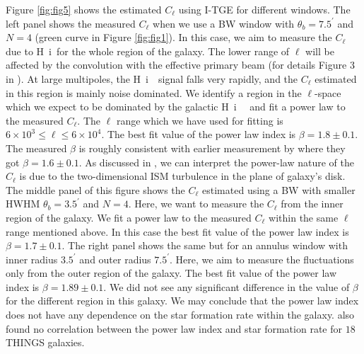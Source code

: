 \documentclass{article}
\def\HI{H~{\sc i}~}
\begin{document}
Figure \ref {fig:fig5} shows the estimated $C_{\ell}$ using I-TGE for
different windows. The left panel shows the measured $C_{\ell}$ when
we use a BW window with $\theta_b=7.5^{'}$ and $N=4$ (green curve in
Figure \ref {fig:fig1}). In this case, we aim to measure the
$C_{\ell}$ due to \HI for the whole region of the galaxy. The lower
range of $\ell$ will be affected by the convolution with the effective
primary beam (for details Figure 3 in \citet{samir14}). At large
multipoles, the \HI~signal falls very rapidly, and the $C_{\ell}$
estimated in this region is mainly noise dominated. We identify a
region in the $\ell$-space which we expect to be dominated by the
galactic \HI~ and fit a power law to the measured $C_{\ell}$. The
$\ell$ range which we have used for fitting is
$6\times10^3\le\ell\le6\times10^4$. The best fit value of the power
law index is $\beta=1.8\pm0.1$. The measured $\beta$ is roughly
consistent with earlier measurement by \citet{dutta13na} where they
got $\beta=1.6\pm0.1$. As discussed in \citet{dutta13na}, we can
interpret the power-law nature of the $C_{\ell}$ is due to the
two-dimensional ISM turbulence in the plane of galaxy's disk. The
middle panel of this figure shows the $C_{\ell}$ estimated using a BW
with smaller HWHM $\theta_b=3.5^{'}$ and $N=4$. Here, we want to
measure the $C_{\ell}$ from the inner region of the galaxy. We fit a
power law to the measured $C_{\ell}$ within the same $\ell$ range
mentioned above. In this case the best fit value of the power law
index is $\beta=1.7\pm0.1$. The right panel shows the same but for an
annulus window with inner radius $3.5^{'}$ and outer radius
$7.5^{'}$. Here, we aim to measure the fluctuations only from the
outer region of the galaxy. The best fit value of the power law index
is $\beta=1.89\pm0.1$. We did not see any significant difference in
the value of $\beta$ for the different region in this galaxy. We may
conclude that the power law index does not have any dependence on the
star formation rate within the galaxy. \citet{dutta13na} also found no
correlation between the power law index and star formation rate for
$18$ THINGS galaxies.
\end{document}
